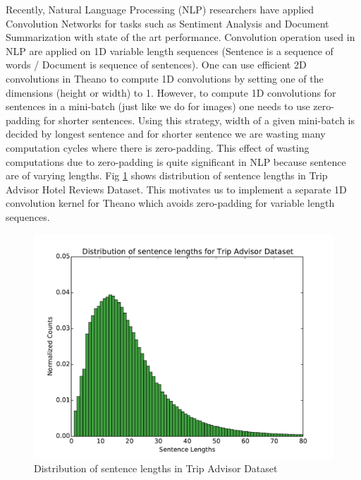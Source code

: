 \documentclass{article}
\begin{document}
Recently, Natural Language Processing (NLP) researchers have applied Convolution Networks for tasks such as Sentiment Analysis \cite{KalchbrennerACL2014} and Document Summarization \cite{Denil2014c} with state of the art performance. Convolution operation used in NLP are applied on 1D variable length sequences (Sentence is a sequence of words / Document is sequence of sentences). One can use efficient 2D convolutions in Theano to compute 1D convolutions by setting one of the dimensions (height or width) to 1. However, to compute 1D convolutions for sentences in a mini-batch (just like we do for images) one needs to use zero-padding for shorter sentences. Using this strategy,  width of a given mini-batch is decided by longest sentence and for shorter sentence we are wasting many computation cycles where there is zero-padding. This effect of wasting computations due to zero-padding is quite significant in NLP because sentence are of varying lengths. Fig \ref{fig:sent_lens} shows distribution of sentence lengths in Trip Advisor Hotel Reviews Dataset. This motivates us to implement a separate 1D convolution kernel for Theano which avoids zero-padding for variable length sequences. 

 \begin{figure}[!htbp]
\begin{center}
\includegraphics[scale=0.4]{sentence_len_dist.pdf}
\end{center}
\caption{Distribution of sentence lengths in Trip Advisor Dataset}
\label{fig:sent_lens}
\end{figure}
\end{document}
